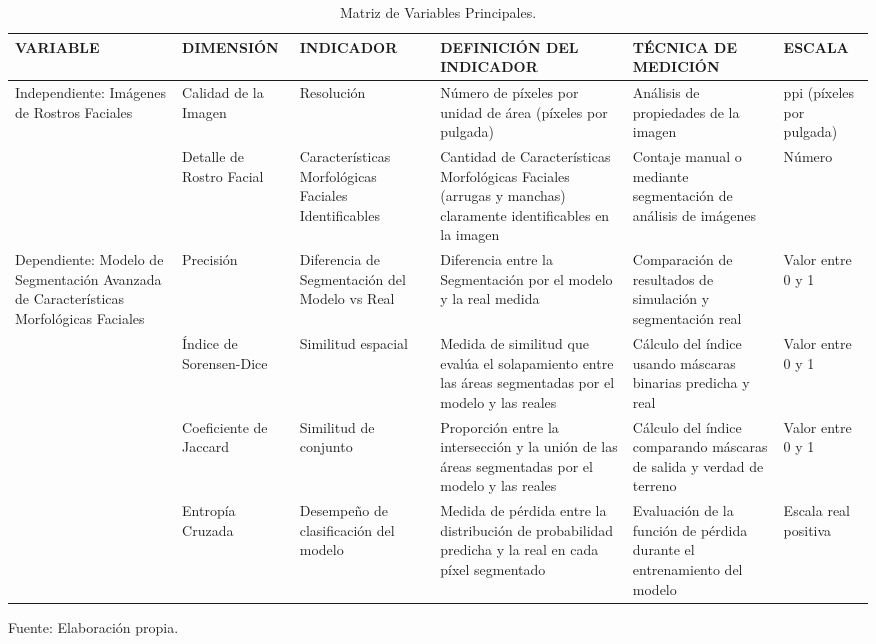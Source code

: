 \begin{longtable}{>{\raggedright\arraybackslash}m{3cm} >{\raggedright\arraybackslash}m{2cm} >{\raggedright\arraybackslash}m{2cm} >{\raggedright\arraybackslash}m{3cm} >{\raggedright\arraybackslash}m{2cm} >{\raggedright\arraybackslash}m{2.5cm}}
    \caption{Matriz de Variables Principales.}
    \label{tabla:variables}\\
    \hline
    VARIABLE & DIMENSIÓN & INDICADOR & DEFINICIÓN DEL INDICADOR & TÉCNICA DE MEDICIÓN & ESCALA \\
    \hline
    Independiente: Imágenes de Rostros Faciales & Calidad de la Imagen & Resolución & Número de píxeles por unidad de área (píxeles por pulgada) & Análisis de propiedades de la imagen & ppi (píxeles por pulgada) \\
    \cline{2-6}
     & Detalle de Rostro Facial & Características Morfológicas Faciales Identificables & Cantidad de Características Morfológicas Faciales (arrugas y manchas) claramente identificables en la imagen & Contaje manual o mediante segmentación de análisis de imágenes & Número \\
    \hline
    Dependiente: Modelo de Segmentación Avanzada de Características Morfológicas Faciales & Precisión & Diferencia de Segmentación del Modelo vs Real & Diferencia entre la Segmentación por el modelo y la real medida & Comparación de resultados de simulación y segmentación real & Valor entre 0 y 1 \\
    \cline{2-6}
     & Índice de Sorensen-Dice & Similitud espacial & Medida de similitud que evalúa el solapamiento entre las áreas segmentadas por el modelo y las reales & Cálculo del índice usando máscaras binarias predicha y real & Valor entre 0 y 1 \\
    \cline{2-6}
     & Coeficiente de Jaccard & Similitud de conjunto & Proporción entre la intersección y la unión de las áreas segmentadas por el modelo y las reales & Cálculo del índice comparando máscaras de salida y verdad de terreno & Valor entre 0 y 1 \\
    \cline{2-6}
	& Entropía Cruzada & Desempeño de clasificación del modelo &  Medida de pérdida entre la distribución de probabilidad predicha y la real en cada píxel segmentado & Evaluación de la función de pérdida durante el entrenamiento del modelo & Escala real positiva \\
    \hline
\end{longtable}
\begin{flushleft}	%
	\small Fuente: Elaboración propia.
\end{flushleft}

